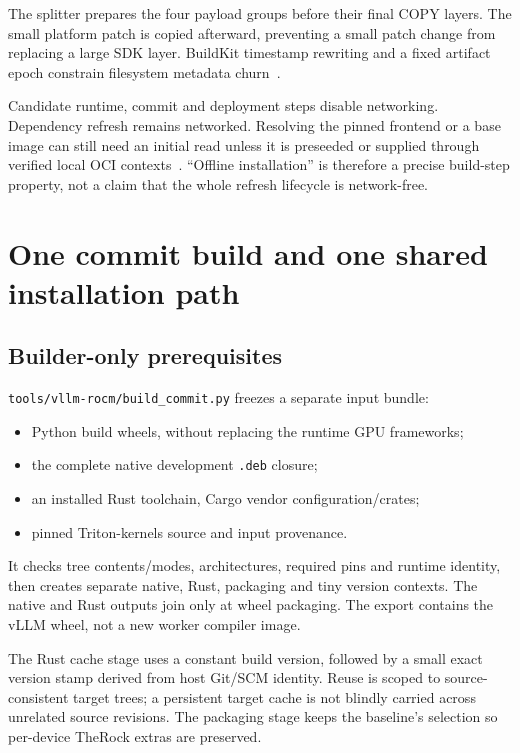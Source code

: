 \documentclass[11pt,a4paper]{article}
\newcommand{\file}[1]{\nolinkurl{#1}}
\newcommand{\term}[1]{\texttt{\detokenize{#1}}}
\begin{document}
The splitter prepares the four payload groups before their final COPY layers.
The small platform patch is copied afterward, preventing a small patch change
from replacing a large SDK layer. BuildKit timestamp rewriting and a fixed
artifact epoch constrain filesystem metadata churn~\cite{exporters}.

Candidate runtime, commit and deployment \term{RUN} steps disable networking.
Dependency refresh remains networked. Resolving the pinned frontend or a base
image can still need an initial read unless it is preseeded or supplied through
verified local OCI contexts~\cite{contexts}. ``Offline installation'' is therefore
a precise build-step property, not a claim that the whole refresh lifecycle is
network-free.

\section{One commit build and one shared installation path}

\subsection{Builder-only prerequisites}

\file{tools/vllm-rocm/build_commit.py} freezes a separate input bundle:
\begin{itemize}
\item Python build wheels, without replacing the runtime GPU frameworks;
\item the complete native development \file{.deb} closure;
\item an installed Rust toolchain, Cargo vendor configuration/crates;
\item pinned Triton-kernels source and input provenance.
\end{itemize}
It checks tree contents/modes, architectures, required pins and runtime identity,
then creates separate native, Rust, packaging and tiny version contexts. The
native and Rust outputs join only at wheel packaging. The export contains the
vLLM wheel, not a new worker compiler image.

The Rust cache stage uses a constant build version, followed by a small exact
version stamp derived from host Git/SCM identity. Reuse is scoped to source-
consistent target trees; a persistent target cache is not blindly carried across
unrelated source revisions. The packaging stage keeps the baseline's
\term{PYTORCH_ROCM_ARCH} selection so per-device TheRock extras are preserved.
\end{document}
